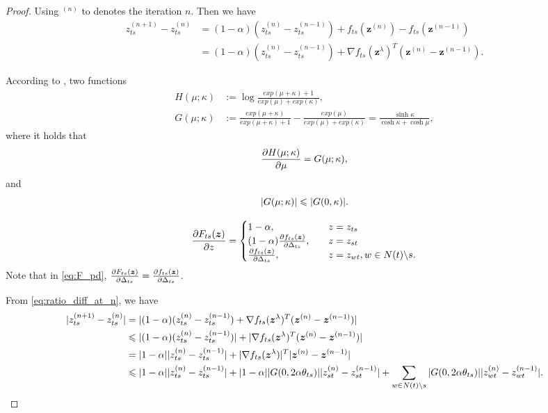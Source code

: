 \documentclass[conference,onecolumn]{IEEEtran}
\begin{document}
\begin{proof}
  Using $^{(n)}$ to denotes the iteration $n$. Then we have
  \begin{align}\label{eq:ratio_diff_at_n}
    z_{ts}^{(n+1)} - z_{ts}^{(n)} &= (1-\alpha) (z_{ts}^{(n)} - z_{ts}^{(n-1)}) + f_{ts}(\bm{z}^{(n)}) - f_{ts}(\bm{z}^{(n-1)}) \nonumber \\
                                  & = (1-\alpha) (z_{ts}^{(n)} - z_{ts}^{(n-1)}) + \nabla f_{ts}(\bm{z}^{\lambda})^{T} (\bm{z}^{(n)} - \bm{z}^{(n-1)}).
  \end{align}

  According to \cite{roosta2008reweighed_sum_product}, two functions
  \begin{align}
    H(\mu; \kappa) &:= \log \frac{exp(\mu + \kappa) +1}{exp(\mu) + exp(\kappa)}, \nonumber \\
    G(\mu; \kappa) &:= \frac{exp(\mu + \kappa)}{exp(\mu + \kappa) + 1} - \frac{exp(\mu)}{exp(\mu) + exp(\kappa)} = \frac{\sinh{\kappa}}{\cosh{\kappa} + \cosh{\mu}},
  \end{align}
  where it holds that
  \begin{equation}
    \frac{ \partial H(\mu; \kappa)}{\partial \mu} = G(\mu; \kappa),
  \end{equation}
  and
  \begin{equation}
    | G(\mu; \kappa) | \leqslant | G(0, \kappa) |.
  \end{equation}

  \begin{equation}\label{eq:F_pd}
    \frac{ \partial F_{ts}(\bm{z})}{\partial z}=
    \begin{cases}
      1 - \alpha, &\quad z = z_{ts}  \\
      ( 1 - \alpha) \frac{ \partial f_{ts}(\bm{z})}{\partial \Delta_{ts}}, &\quad z = z_{st} \\
      \frac{ \partial f_{ts}(\bm{z})}{\partial \Delta_{ts}}, &\quad z = z_{wt}, w\in N(t)\backslash s.
    \end{cases}
  \end{equation}
  Note that in \eqref{eq:F_pd}, $\frac{ \partial F_{ts}(\bm{z})}{\partial \Delta_{ts}} = \frac{ \partial f_{ts}(\bm{z})}{\partial \Delta_{ts}}$.

  From \eqref{eq:ratio_diff_at_n}, we have
  \begin{align}\label{eq:ratio_cvg_step}
    | z_{ts}^{(n+1)} - z_{ts}^{(n)} | & = | (1-\alpha) (z_{ts}^{(n)} - z_{ts}^{(n-1)}) + \nabla f_{ts}(\bm{z}^{\lambda})^{T} (\bm{z}^{(n)} - \bm{z}^{(n-1)}) | \nonumber \\
                                        & \leqslant | (1-\alpha) (z_{ts}^{(n)} - z_{ts}^{(n-1)}) | + | \nabla f_{ts}(\bm{z}^{\lambda})^{T} (\bm{z}^{(n)} - \bm{z}^{(n-1)}) | \nonumber \\
                                        & = |  1 - \alpha | | z_{ts}^{(n)} - z_{ts}^{(n-1)} | + | \nabla f_{ts}(\bm{z}^{\lambda}) |^{T} | \bm{z}^{(n)} - \bm{z}^{(n-1)} | \nonumber \\
                                        & \leqslant |  1 - \alpha | | z_{ts}^{(n)} - z_{ts}^{(n-1)} | + |  1 - \alpha | | G(0, 2 \alpha \theta_{ts}) | | z_{st}^{(n)} - z_{st}^{(n-1)} | + \sum_{w\in N(t)\backslash s} | G(0, 2 \alpha \theta_{ts}) | | z_{wt}^{(n)} - z_{wt}^{(n-1)} |.
  \end{align}


\end{proof}
\end{document}
